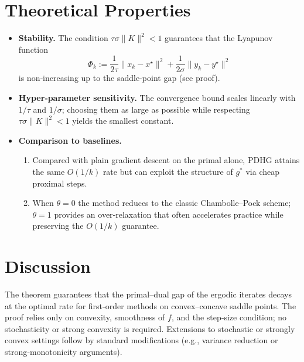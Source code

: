 \documentclass{article}
\begin{document}
\section*{Theoretical Properties}
\begin{itemize}
    \item \textbf{Stability.} The condition $\tau\sigma\|K\|^{2}<1$ guarantees that the
    Lyapunov function
    \[
    \Phi_k:=\frac{1}{2\tau}\|x_k-x^{\star}\|^{2}+\frac{1}{2\sigma}\|y_k-y^{\star}\|^{2}
    \]
    is non‑increasing up to the saddle‑point gap (see proof).
    \item \textbf{Hyper‑parameter sensitivity.} The convergence bound scales linearly with
    $1/\tau$ and $1/\sigma$; choosing them as large as possible while respecting
    $\tau\sigma\|K\|^{2}<1$ yields the smallest constant.
    \item \textbf{Comparison to baselines.}
    \begin{enumerate}
        \item Compared with plain gradient descent on the primal alone, PDHG attains the same
        $O(1/k)$ rate but can exploit the structure of $g^{*}$ via cheap proximal steps.
        \item When $\theta=0$ the method reduces to the classic Chambolle–Pock scheme;
        $\theta=1$ provides an over‑relaxation that often accelerates practice while preserving the $O(1/k)$ guarantee.
    \end{enumerate}
\end{itemize}

\section*{Discussion}
The theorem guarantees that the primal–dual gap of the ergodic iterates decays at the optimal
rate for first‑order methods on convex–concave saddle points. The proof relies only on convexity,
smoothness of $f$, and the step‑size condition; no stochasticity or strong convexity is required.
Extensions to stochastic or strongly convex settings follow by standard modifications
(e.g., variance reduction or strong‑monotonicity arguments).

\newpage
\end{document}
